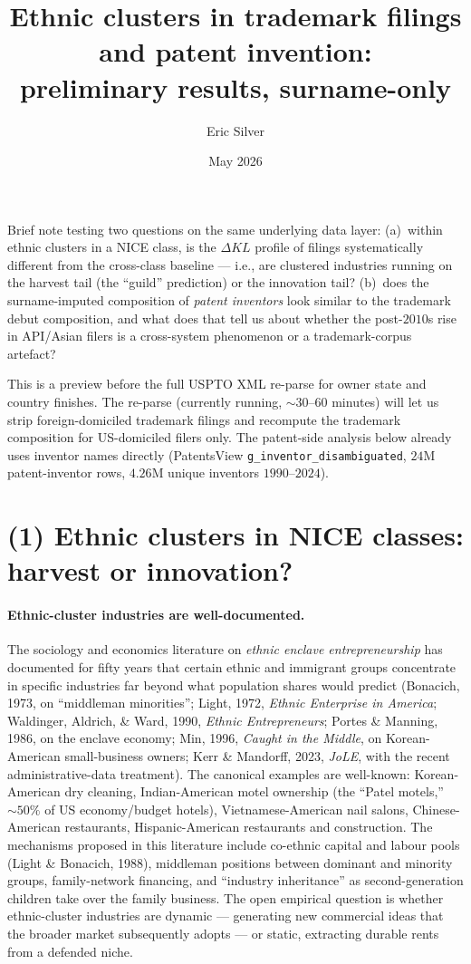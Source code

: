 \documentclass[11pt]{article}
\title{Ethnic clusters in trademark filings and patent invention:\\
preliminary results, surname-only}
\author{Eric Silver}
\affil{}
\date{May 2026}
\begin{document}
\maketitle

\noindent
Brief note testing two questions on the same underlying data layer:
(a)~within ethnic clusters in a NICE class, is the $\Delta KL$ profile
of filings systematically different from the cross-class baseline ---
i.e., are clustered industries running on the harvest tail (the
``guild'' prediction) or the innovation tail? (b)~does the surname-imputed
composition of \emph{patent inventors} look similar to the trademark
debut composition, and what does that tell us about whether the
post-$2010$s rise in API/Asian filers is a cross-system phenomenon
or a trademark-corpus artefact?

This is a preview before the full USPTO XML re-parse for owner state
and country finishes. The re-parse (currently running, $\sim 30$--$60$
minutes) will let us strip foreign-domiciled trademark filings and
recompute the trademark composition for US-domiciled filers only.
The patent-side analysis below already uses inventor names directly
(PatentsView \texttt{g\_inventor\_disambiguated}, $24$M
patent-inventor rows, $4.26$M unique inventors $1990$--$2024$).

\section*{(1) Ethnic clusters in NICE classes: harvest or innovation?}

\paragraph{Ethnic-cluster industries are well-documented.} The
sociology and economics literature on \emph{ethnic enclave
entrepreneurship} has documented for fifty years that certain
ethnic and immigrant groups concentrate in specific industries far
beyond what population shares would predict (Bonacich, 1973, on
``middleman minorities''; Light, 1972, \emph{Ethnic Enterprise in
America}; Waldinger, Aldrich, \& Ward, 1990, \emph{Ethnic
Entrepreneurs}; Portes \& Manning, 1986, on the enclave economy;
Min, 1996, \emph{Caught in the Middle}, on Korean-American
small-business owners; Kerr \& Mandorff, 2023, \emph{JoLE}, with
the recent administrative-data treatment). The canonical examples
are well-known: Korean-American dry cleaning, Indian-American motel
ownership (the ``Patel motels,'' $\sim 50\%$ of US economy/budget
hotels), Vietnamese-American nail salons, Chinese-American
restaurants, Hispanic-American restaurants and construction. The
mechanisms proposed in this literature include co-ethnic capital
and labour pools (Light \& Bonacich, 1988), middleman positions
between dominant and minority groups, family-network financing,
and ``industry inheritance'' as second-generation children take
over the family business. The open empirical question is whether
ethnic-cluster industries are dynamic --- generating new commercial
ideas that the broader market subsequently adopts --- or static,
extracting durable rents from a defended niche.
\end{document}
